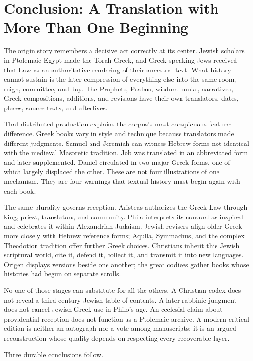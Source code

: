\section{Conclusion: A Translation with More Than One Beginning}

The origin story remembers a decisive act correctly at its center. Jewish scholars in Ptolemaic Egypt made the Torah Greek, and Greek-speaking Jews received that Law as an authoritative rendering of their ancestral text. What history cannot sustain is the later compression of everything else into the same room, reign, committee, and day. The Prophets, Psalms, wisdom books, narratives, Greek compositions, additions, and revisions have their own translators, dates, places, source texts, and afterlives.

That distributed production explains the corpus's most conspicuous feature: difference. Greek books vary in style and technique because translators made different judgments. Samuel and Jeremiah can witness Hebrew forms not identical with the medieval Masoretic tradition. Job was translated in an abbreviated form and later supplemented. Daniel circulated in two major Greek forms, one of which largely displaced the other. These are not four illustrations of one mechanism. They are four warnings that textual history must begin again with each book.

The same plurality governs reception. Aristeas authorizes the Greek Law through king, priest, translators, and community. Philo interprets its concord as inspired and celebrates it within Alexandrian Judaism. Jewish revisers align older Greek more closely with Hebrew reference forms; Aquila, Symmachus, and the complex Theodotion tradition offer further Greek choices. Christians inherit this Jewish scriptural world, cite it, defend it, collect it, and transmit it into new languages. Origen displays versions beside one another; the great codices gather books whose histories had begun on separate scrolls.

No one of those stages can substitute for all the others. A Christian codex does not reveal a third-century Jewish table of contents. A later rabbinic judgment does not cancel Jewish Greek use in Philo's age. An ecclesial claim about providential reception does not function as a Ptolemaic archive. A modern critical edition is neither an autograph nor a vote among manuscripts; it is an argued reconstruction whose quality depends on respecting every recoverable layer.

Three durable conclusions follow.

